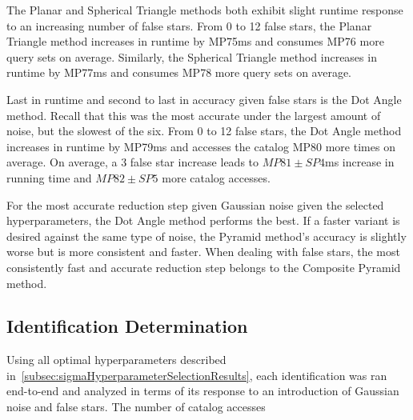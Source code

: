 The Planar and Spherical Triangle methods both exhibit slight runtime response to an increasing number of false
stars.
From 0 to 12 false stars, the Planar Triangle method increases in runtime by MP75ms and consumes MP76 more query sets
on average.
Similarly, the Spherical Triangle method increases in runtime by MP77ms and consumes MP78 more query sets on average.

Last in runtime and second to last in accuracy given false stars is the Dot Angle method.
Recall that this was the most accurate under the largest amount of noise, but the slowest of the six.
From 0 to 12 false stars, the Dot Angle method increases in runtime by MP79ms and accesses the catalog MP80 more times
on average.
On average, a 3 false star increase leads to $MP81 \pm SP4$ms increase in running time and $MP82 \pm SP5$ more
catalog accesses.

For the most accurate reduction step given Gaussian noise given the selected hyperparameters, the Dot Angle method
performs the best.
If a faster variant is desired against the same type of noise, the Pyramid method's accuracy is slightly worse but
is more consistent and faster.
When dealing with false stars, the most consistently fast and accurate reduction step belongs to the Composite Pyramid
method.

\subsection{Identification Determination}\label{subsec:identificationDeterminationResults}
Using all optimal hyperparameters described in~\autoref{subsec:sigmaHyperparameterSelectionResults}, each identification
was ran end-to-end and analyzed in terms of its response to an introduction of Gaussian noise and false stars.
The number of catalog accesses

\begin{figure}
\end{figure}

